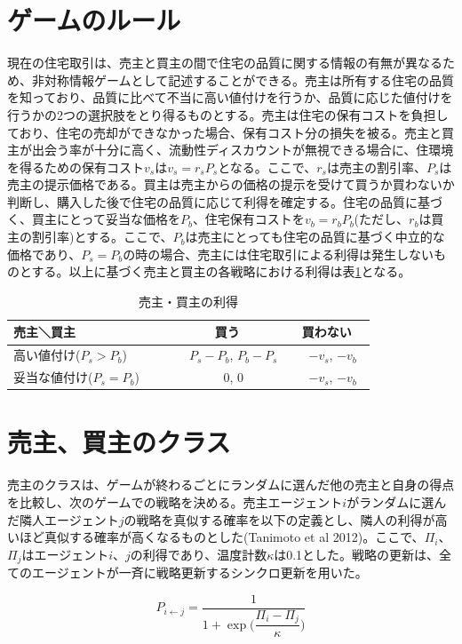 \documentclass[a4paper,fontsize=11pt,report,notitlepage,line_length=38zw,number_of_lines=40,dvipdfmx]{jlreq}
\begin{document}
\section{ゲームのルール}
現在の住宅取引は、売主と買主の間で住宅の品質に関する情報の有無が異なるため、非対称情報ゲームとして記述することができる。売主は所有する住宅の品質を知っており、品質に比べて不当に高い値付けを行うか、品質に応じた値付けを行うかの2つの選択肢をとり得るものとする。売主は住宅の保有コストを負担しており、住宅の売却ができなかった場合、保有コスト分の損失を被る。売主と買主が出会う率が十分に高く、流動性ディスカウントが無視できる場合に、住環境を得るための保有コスト$v_s$は$v_s=r_sP_s$となる。ここで、$r_s$は売主の割引率、$P_s$は売主の提示価格である。買主は売主からの価格の提示を受けて買うか買わないか判断し、購入した後で住宅の品質に応じて利得を確定する。住宅の品質に基づく、買主にとって妥当な価格を$P_b$、住宅保有コストを$v_b=r_bP_b$(ただし、$r_b$は買主の割引率)とする。ここで、$P_b$は売主にとっても住宅の品質に基づく中立的な価格であり、$P_s=P_b$の時の場合、売主には住宅取引による利得は発生しないものとする。以上に基づく売主と買主の各戦略における利得は表\ref{ritoku}となる。

\begin{table}
\begin{center}
\caption{売主・買主の利得}
\label{ritoku}
\begin{tabular}{l|cc}
売主＼買主 & 買う & 買わない \\ \hline
高い値付け($P_s>P_b$)　　 & 　$P_s-P_b$,  $P_b-P_s$ & 　$-v_s$,  $-v_b$　 \\
妥当な値付け($P_s=P_b$)　　 & 　0, 0 & 　$-v_s$,  $-v_b$　
\end{tabular}
\end{center}
\end{table}%

\section{売主、買主のクラス}
売主のクラスは、ゲームが終わるごとにランダムに選んだ他の売主と自身の得点を比較し、次のゲームでの戦略を決める。売主エージェント$i$がランダムに選んだ隣人エージェント$j$の戦略を真似する確率を以下の定義とし、隣人の利得が高いほど真似する確率が高くなるものとした(Tanimoto et al 2012)\cite{tanimoto2012}。ここで、$\Pi_i$、$\Pi_j$はエージェント$i$、$j$の利得であり、温度計数$\kappa$は0.1とした。戦略の更新は、全てのエージェントが一斉に戦略更新するシンクロ更新を用いた。

\begin{equation}
P_{i \gets j}=\dfrac{1}{1+\exp\biggl(\dfrac{\Pi_i-\Pi_j}{\kappa}\biggr)}
\end{equation}
\end{document}
